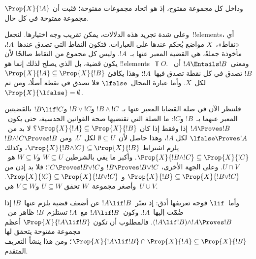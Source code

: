 \documentclass[../../../include/open-logic-section]{subfiles}
\begin{document}
وداخل كل مجموعة مفتوح، إذ هو اتحاد مجموعات مفتوحة؛ فثبت أن
$\Prop{X}{!A}$ مجموعة مفتوحة في كل حال.

وعلى شدة تجريد هذه الدلالات، يمكن تقريب وجه اختيارها. لنجعل~!!{element}s،
أي «نقاط»،~$X$ مواضع يُحكم عندها على العبارات. فتكون النقاط التي تصدق
عندها~$!A$، مأخوذة جملةً، هي القضية المعبر عنها بـ~$!A$. وليس كل مجموع
من النقاط صالحًا لأن يكون قضية، بل الذي يصلح لذلك إنما هو
!!{element}s~$\Top{O}$. ومعنى~$!A \Entails !B$ أن~$!B$ تصدق في كل
نقطة تصدق فيها~$!A$؛ وهذا يكافئ
$\Prop{X}{!A}\subseteq\Prop{X}{!B}$ لكل~$X$. وأما عبارة
المحال~$\lfalse$ فلا تصدق في نقطة أصلًا، ومن ثم~$\Prop{X}{\lfalse}=\emptyset$.

فلننظر الآن في صلة القضايا المعبر عنها بـ~$!B \land !C$ و$!B \lor !C$
و$!B \lif !C$ بالقضيتين المعبر عنهما بـ~$!B$ و$!C$: ما الصلة التي
تقتضيها صحة القوانين الحدسية، حتى يكون~$!A \Proves !B$ إذا وفقط إذا كان
$\Prop{X}{!A}\subseteq\Prop{X}{!B}$؟ لا بد من~$\lfalse \Proves !A$ لكل
$!A$، وهذا حاصل لأن~$\emptyset\subseteq U$ لكل~$U$. ومن
$!B \land !C \Proves !B$ يلزم اشتراط
$\Prop{X}{!B \land !C}\subseteq\Prop{X}{!B}$، وكذلك
$\Prop{X}{!B \land !C}\subseteq\Prop{X}{!C}$. وأكبر ما يفي بالشرطين
$W \subseteq U$ و$W \subseteq V$ هو~$U \cap V$. وعلى الجهة الأخرى،
$!B \Proves !B \lor !C$ و$!C \Proves !B \lor !C$؛ فلا بد إذن من
$\Prop{X}{!B}\subseteq\Prop{X}{!B \lor !C}$ و
$\Prop{X}{!C}\subseteq\Prop{X}{!B \lor !C}$. وأصغر مجموعة~$W$ تحقق
$U \subseteq W$ و$V \subseteq W$ هي~$U \cup V$.

وأما~$\lif$ فوجه تعريفها أدق: إذ تعبّر~$!A \lif !B$ عن أضعف قضية
يلزم عنها~$!B$ إذا ضُمّت إليها~$!A$. وكون~$!A \lif !B$ مع~$!A$
تستلزم~$!B$ ظاهر من~$(!A \lif !B)\land !A \Proves !B$. فالمطلوب أن تكون
$\Prop{X}{!A \lif !B}$ أعظم مجموعة مفتوحة يتحقق لها
$\Prop{X}{!A \lif !B}\cap\Prop{X}{!A}\subseteq\Prop{X}{!B}$؛ ومن هذا
ينشأ التعريف المتقدم.
\end{document}

